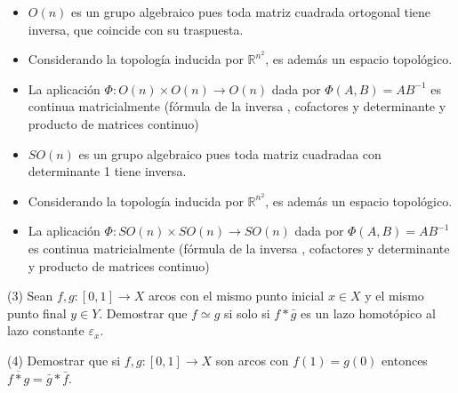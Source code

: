 \documentclass[
  a4paper,
  spanish,
  12pt,
]{scrartcl}
\begin{document}
\begin{sol}
\begin{itemize}
\item{$O(n)$ es un grupo algebraico pues toda matriz cuadrada ortogonal tiene inversa, que coincide con su traspuesta.}
\item{Considerando la topología inducida por $\mathbb{R}^{n^2}$, es además un espacio topológico.}
\item{La aplicación $\Phi: O(n) \times O(n) \rightarrow O(n)$ dada por $\Phi(A, B) = AB^{-1}$
es continua matricialmente (fórmula de la inversa , cofactores y determinante y producto de matrices continuo)}
\end{itemize}

\begin{itemize}
\item{$SO(n)$ es un grupo algebraico pues toda matriz cuadradaa con determinante 1 tiene inversa.}
\item{Considerando la topología inducida por $\mathbb{R}^{n^2}$, es además un espacio topológico.}
\item{La aplicación $\Phi: SO(n) \times SO(n) \rightarrow SO(n)$ dada por $\Phi(A, B) = AB^{-1}$
es continua matricialmente (fórmula de la inversa , cofactores y determinante y producto de matrices continuo)}
\end{itemize}

\end{sol}

\begin{ejer}
(3) Sean $f, g:[0,1] \rightarrow X$ arcos con el mismo punto inicial $x \in X$ y el mismo punto final $y \in Y$. Demostrar que $f \simeq g$ si solo si $f * \bar{g}$ es un lazo homotópico al lazo constante $\varepsilon_{x}$.\\
\end{ejer}

\begin{ejer}
(4) Demostrar que si $f, g:[0,1] \rightarrow X$ son arcos con $f(1)=g(0)$ entonces $\overline{f * g}=\bar{g} * \bar{f}$.\\
\end{ejer}
\end{document}
